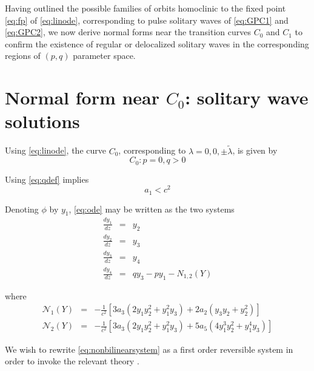 Having outlined the possible families of orbits homoclinic to the fixed point \eqref{eq:fp} of \eqref{eq:linode},
corresponding to pulse solitary waves of \eqref{eq:GPC1} and \eqref{eq:GPC2}, we now derive normal forms near the transition curves $C_0$ and $C_1$
to confirm the existence of regular or delocalized solitary waves in the corresponding regions of $\left(p,q\right)$ parameter space.


\section{Normal form near $C_0$: solitary wave solutions}

Using \eqref{eq:linode}, the curve $C_0$, corresponding to $\lambda = 0,0,\pm \tilde{ \lambda } $, is given by
\begin{equation}
C_0: { p=0, q > 0 }
\end{equation}

Using \eqref{eq:qdef} implies
\begin{equation}
a_1 < c^2 
\end{equation}

Denoting $\phi$ by $y_1$, \eqref{eq:ode} may be written as the two systems
\begin{subequations}\label{eq:nonbilinearsystem}
\begin{eqnarray}
\frac{d y_1 }{d z} &=& y_2 \\
\frac{d y_2 }{d z} &=& y_3 \\
\frac{d y_3 }{d z} &=& y_4 \\
\frac{d y_4 }{d z} &=& q y_3 - p y_1 - N_{1,2}(Y)
\end{eqnarray}
\end{subequations}

where
\begin{subequations}
\begin{eqnarray}
\mathcal{N}_1\left(Y\right) &=& - \frac{1}{c^2}\left[  3 a_3 \left( 2 y_1 y_2^2 + y_1^2 y_3 \right) + 2 a_2\left( y_3 y_2 + y_2^2\right) \right] \\
\mathcal{N}_2\left(Y\right) &=& - \frac{1}{c^2}\left[ 3 a_3 \left( 2 y_1 y_2^2 + y_1^2 y_3\right) + 5 a_5 \left( 4 y_1^3 y_2^2 + y_1^4 y_3 \right) \right]
\end{eqnarray}
\end{subequations}

We wish to rewrite \eqref{eq:nonbilinearsystem} as a first order reversible system in order to invoke the relevant theory \cite{IA}. 


